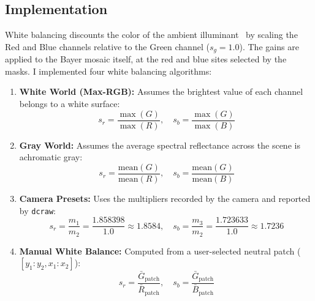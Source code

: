 \documentclass[a4paper]{article}
\begin{document}
\subsection{Implementation}
White balancing discounts the color of the ambient illuminant~\cite{ebner2007color} by scaling the Red and Blue channels relative to the Green channel ($s_g = 1.0$). The gains are applied to the Bayer mosaic itself, at the red and blue sites selected by the masks. I implemented four white balancing algorithms:
\begin{enumerate}
    \item \textbf{White World (Max-RGB):} Assumes the brightest value of each channel belongs to a white surface:
    \begin{equation}
        s_r = \frac{\max(G)}{\max(R)}, \quad s_b = \frac{\max(G)}{\max(B)}
    \end{equation}
    \item \textbf{Gray World:} Assumes the average spectral reflectance across the scene is achromatic gray:
    \begin{equation}
        s_r = \frac{\text{mean}(G)}{\text{mean}(R)}, \quad s_b = \frac{\text{mean}(G)}{\text{mean}(B)}
    \end{equation}
    \item \textbf{Camera Presets:} Uses the multipliers recorded by the camera and reported by \texttt{dcraw}:
    \begin{equation}
        s_r = \frac{m_1}{m_2} = \frac{1.858398}{1.0} \approx 1.8584, \quad s_b = \frac{m_3}{m_2} = \frac{1.723633}{1.0} \approx 1.7236
    \end{equation}
    \item \textbf{Manual White Balance:} Computed from a user-selected neutral patch ($[y_1:y_2, x_1:x_2]$):
    \begin{equation}
        s_r = \frac{\bar{G}_{\text{patch}}}{\bar{R}_{\text{patch}}}, \quad s_b = \frac{\bar{G}_{\text{patch}}}{\bar{B}_{\text{patch}}}
    \end{equation}
\end{enumerate}
\end{document}
